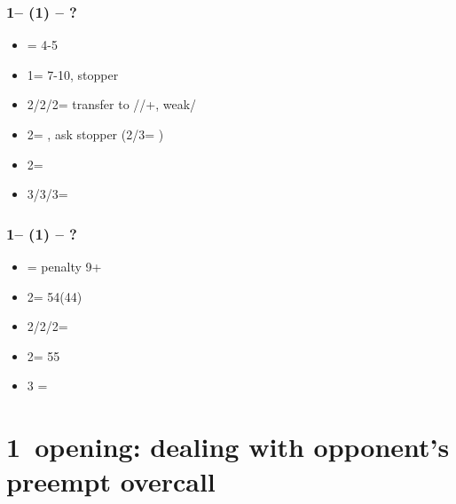 \subsubsection*{1\clubs -- (1\spades) -- ?}
\begin{itemize}
    \item \dbl = 4-5\hearts
    \item 1\nt = 7-10, \spades stopper
    \item 2\clubs/2\diams/2\spades = transfer to \diams/\hearts/+, weak/\gf
    \item 2\hearts = \invp, ask stopper (2\nt/3\clubs = \nf)
    \item 2\nt = \inv
    \item 3\clubs/3\diams/3\hearts = \inv
\end{itemize}

\subsubsection*{1\clubs -- (1\nt) -- ?}
\begin{itemize}
    \item \dbl = penalty 9+
    \item 2\clubs = 54\major (44)
    \item 2\diams/2\hearts/2\spades = \nf
    \item 2\nt = 55\minor
    \item 3 = \inv\ \unbal
\end{itemize}


\section{\texorpdfstring{1\clubs\ opening: dealing with opponent's preempt overcall}{oppsOvercallTfx1cPreempt}}\label{sec:oppsOvercallTfx1cPreempt}

